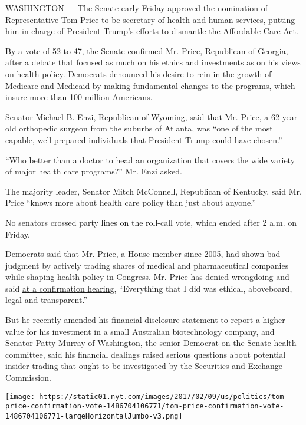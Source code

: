 WASHINGTON --- The Senate early Friday approved the nomination of
Representative Tom Price to be secretary of health and human services,
putting him in charge of President Trump's efforts to dismantle the
Affordable Care Act.

By a vote of 52 to 47, the Senate confirmed Mr. Price, Republican of
Georgia, after a debate that focused as much on his ethics and
investments as on his views on health policy. Democrats denounced his
desire to rein in the growth of Medicare and Medicaid by making
fundamental changes to the programs, which insure more than 100 million
Americans.

Senator Michael B. Enzi, Republican of Wyoming, said that Mr. Price, a
62-year-old orthopedic surgeon from the suburbs of Atlanta, was ``one of
the most capable, well-prepared individuals that President Trump could
have chosen.''

``Who better than a doctor to head an organization that covers the wide
variety of major health care programs?'' Mr. Enzi asked.

The majority leader, Senator Mitch McConnell, Republican of Kentucky,
said Mr. Price ``knows more about health care policy than just about
anyone.''

No senators crossed party lines on the roll-call vote, which ended after
2 a.m. on Friday.

Democrats said that Mr. Price, a House member since 2005, had shown bad
judgment by actively trading shares of medical and pharmaceutical
companies while shaping health policy in Congress. Mr. Price has denied
wrongdoing and said
\href{https://www.nytimes.com/2017/01/24/us/politics/tom-price-nominee-secretary-of-health-and-human-services.html}{at
a confirmation hearing}, ``Everything that I did was ethical,
aboveboard, legal and transparent.''

But he recently amended his financial disclosure statement to report a
higher value for his investment in a small Australian biotechnology
company, and Senator Patty Murray of Washington, the senior Democrat on
the Senate health committee, said his financial dealings raised serious
questions about potential insider trading that ought to be investigated
by the Securities and Exchange Commission.

\href{https://www.nytimes.com/interactive/2017/02/10/us/politics/tom-price-confirmation-vote.html}{}

\texttt{[image: https://static01.nyt.com/images/2017/02/09/us/politics/tom-price-confirmation-vote-1486704106771/tom-price-confirmation-vote-1486704106771-largeHorizontalJumbo-v3.png]}

